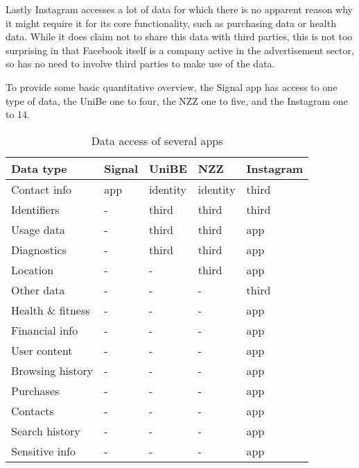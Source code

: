 \documentclass[a4paper]{scrreprt}
\begin{document}
Lastly Instagram accesses a lot of data for which there is no apparent reason
why it might require it for its core functionality, such as purchasing data or
health data. While it does claim not to share this data with third parties,
this is not too surprising in that Facebook itself is a company active in the
advertisement sector, so has no need to involve third parties to make use of
the data.

To provide some basic quantitative overview, the Signal app has access to one
type of data, the UniBe one to four, the NZZ one to five, and the Instagram one
to 14.

\begin{table}
		\centering
		\begin{tabular}{lllll}
				\toprule
				Data type & Signal & UniBE & NZZ & Instagram \\
				\midrule
				Contact info      & app & identity & identity & third \\
				Identifiers       & -   & third    & third    & third \\
				Usage data        & -   & third    & third    & app \\
				Diagnostics       & -   & third    & third    & app \\
				Location          & -   & -        & third    & app \\
				Other data        & -   & -        & -        & third \\
				Health \& fitness & -   & -        & -        & app \\
				Financial info    & -   & -        & -        & app \\
				User content      & -   & -        & -        & app \\
				Browsing history  & -   & -        & -        & app \\
				Purchases         & -   & -        & -        & app \\
				Contacts          & -   & -        & -        & app \\
				Search history    & -   & -        & -        & app \\
				Sensitive info    & -   & -        & -        & app \\
				\bottomrule
		\end{tabular}
		\caption{Data access of several apps}
		\label{tbl:data_access_apps}
\end{table}

\printbibliography
\end{document}
